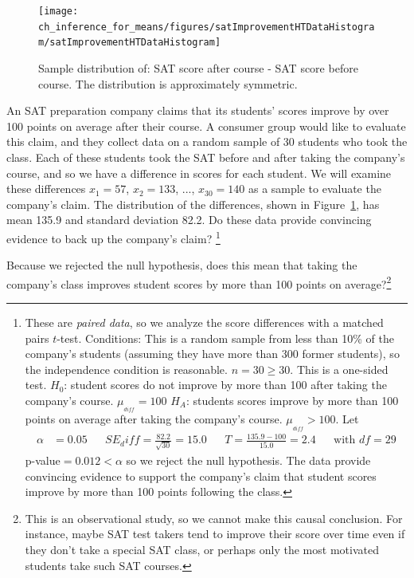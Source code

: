 \begin{figure}[h]
\centering
\texttt{[image: ch\_inference\_for\_means/figures/satImprovementHTDataHistogram/satImprovementHTDataHistogram]}
\caption{Sample distribution of:  SAT score after course - SAT score before course. The distribution is approximately symmetric.}
\label{satImprovementHTDataHistogram}
\end{figure}

\begin{exercise}An SAT preparation company claims that its students' scores improve by over 100 points on average after their course. A consumer group would like to evaluate this claim, and they collect data on a random sample of 30 students who took the class. Each of these students took the SAT before and after taking the company's course, and so we have a difference in scores for each student. We will examine these differences $x_1=57$, $x_2=133$, ..., $x_{30}=140$ as a sample to evaluate the company's claim. The distribution of the differences, shown in Figure~\ref{satImprovementHTDataHistogram}, has mean 135.9 and standard deviation 82.2. Do these data provide convincing evidence to back up the company's claim?
\footnote{These are \emph{paired data}, so we analyze the score differences with a matched pairs $t$-test. Conditions: This is a random sample from less than 10\% of the company's students (assuming they have more than 300 former students), so the independence condition is reasonable. $n=30\ge 30$.
This is a one-sided test. $H_0$: student scores do not improve by more than 100 after taking the company's course. $\mu_{_{diff}} = 100$  $H_A$: students scores improve by more than 100 points on average after taking the company's course. $\mu_{_{diff}} > 100$.
Let
\begin{align*}
\alpha&=0.05
&&SE_diff = \frac{82.2}{\sqrt{30}} = 15.0
&&T = \frac{135.9-100}{15.0}=2.4
&&\text{with }df=29
\end{align*}
p-value$=0.012<\alpha$ so we reject the null hypothesis. The data provide convincing evidence to support the company's claim that student scores improve by more than 100 points following the class.}
\end{exercise}

\begin{exercise}
Because we rejected the null hypothesis, does this mean that taking the company's class improves student scores by more than 100 points on average?\footnote{This is an observational study, so we cannot make this causal conclusion. For instance, maybe SAT test takers tend to improve their score over time even if they don't take a special SAT class, or perhaps only the most motivated students take such SAT courses.}


\end{exercise}



